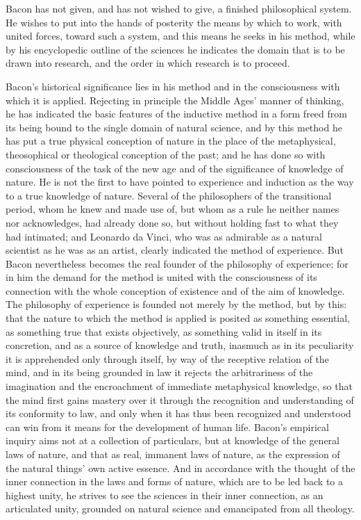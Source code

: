 \divrule

Bacon has not given, and has not wished to give, a finished philosophical system. He wishes to put into the hands of posterity the means by which to work, with united forces, toward such a system, and this means he seeks in his method, while by his encyclopedic outline of the sciences he indicates the domain that is to be drawn into research, and the order in which research is to proceed.

Bacon's historical significance lies in his method and in the consciousness with which it is applied. Rejecting in principle the Middle Ages' manner of thinking, he has indicated the basic features of the inductive method in a form freed from its being bound to the single domain of natural science, and by this method he has put a true physical conception of nature in the place of the metaphysical, theosophical or theological conception of the past; and he has done so with consciousness of the task of the new age and of the significance of knowledge of nature. He is not the first to have pointed to experience and induction as the way to a true knowledge of nature. Several of the philosophers of the transitional period, whom he knew and made use of, but whom as a rule he neither names nor acknowledges, had already done so, but without holding fast to what they had intimated; and Leonardo da Vinci, who was as admirable as a natural scientist as he was as an artist, clearly indicated the method of experience. But Bacon nevertheless becomes the real founder of the philosophy of experience; for in him the demand for the method is united with the consciousness of its connection with the whole conception of existence and of the aim of knowledge. The philosophy of experience is founded not merely by the method, but by this: that the nature to which the method is applied is posited as something essential, as something true that exists objectively, as something valid in itself in its concretion, and as a source of knowledge and truth, inasmuch as in its peculiarity it is apprehended only through itself, by way of the receptive relation of the mind, and in its being grounded in law it rejects the arbitrariness of the imagination and the encroachment of immediate metaphysical \setcounter{footnote}{0}knowledge, so that the mind first gains mastery over it through the recognition and understanding of its conformity to law, and only when it has thus been recognized and understood can win from it means for the development of human life. Bacon's empirical inquiry aims not at a collection of particulars, but at knowledge of the general laws of nature, and that as real, immanent laws of nature, as the expression of the natural things' own active essence. And in accordance with the thought of the inner connection in the laws and forms of nature, which are to be led back to a highest unity, he strives to see the sciences in their inner connection, as an articulated unity, grounded on natural science and emancipated from all theology.


